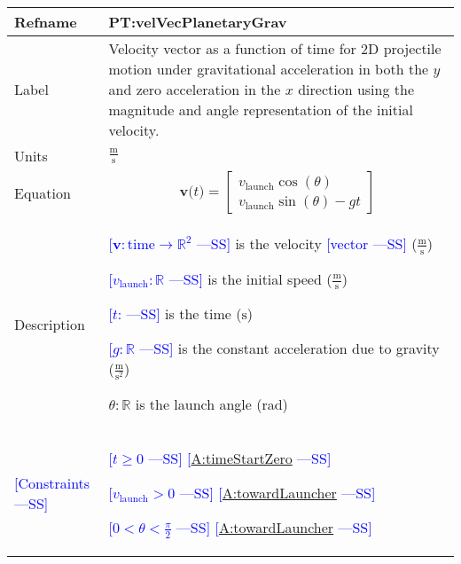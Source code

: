 \documentclass[12pt]{article}
\newcommand{\authornote}[3]{\textcolor{#1}{[#3 ---#2]}}
\newcommand{\authornote}[3]{}
\newcommand{\wss}[1]{\authornote{blue}{SS}{#1}}
\begin{document}
\noindent
\begin{minipage}{\textwidth}
\begin{tabular}{>{\raggedright}p{}>{\raggedright\arraybackslash}p{}}
\toprule \textbf{Refname} & \textbf{PT:velVecPlanetaryGrav} 
\label{PT:velVecPlanetaryGrav} \\ \midrule Label & Velocity vector as a function
of time for 2D projectile motion under gravitational acceleration in both the
$y$ and zero acceleration in the $x$ direction using the magnitude and angle
representation of the initial velocity.
        
\\ \midrule
Units & $\frac{\text{m}}{\text{s}}$
        
\\ \midrule
Equation & \begin{displaymath}
           \symbf{v}\text{(}t\text{)}=\begin{bmatrix}
                                      {{v}_{\text{launch}}} \cos(\theta)\\
                                      {{v}_{\text{launch}}} \sin(\theta) - gt
                                      \end{bmatrix}
           \end{displaymath}
\\ \midrule
Description & \begin{symbDescription}
              \item{\wss{$\symbf{v}: \text{time} \rightarrow \mathbb{R}^2$} is the velocity \wss{vector} ($\frac{\text{m}}{\text{s}}$)}
              \item{\wss{${{v}_{\text{launch}}}: \mathbb{R}$} is the initial speed ($\frac{\text{m}}{\text{s}}$)}
              \item{\wss{$t$: \text{time}} is the time (${\text{s}}$)}
              \item{\wss{$g: \mathbb{R}$} is the constant acceleration due to gravity ($\frac{\text{m}}{\text{s}^{2}}$)}
              \item $\theta: \mathbb{R}$ is the launch angle (rad)
              \end{symbDescription}

\\ \midrule
\wss{Constraints} & 
\begin{symbDescription}
\item \wss{$t \geq 0$} \wss{\hyperref[timeStartZero]{A:timeStartZero}}
\item \wss{$v_\text{launch} > 0$} \wss{\hyperref[towardLauncher]{A:towardLauncher}}
\item \wss{$
0 < \theta < \frac{\pi}{2}$} \wss{\hyperref[towardLauncher]{A:towardLauncher}}
\end{symbDescription}


\end{tabular}
\end{minipage}
\end{document}
